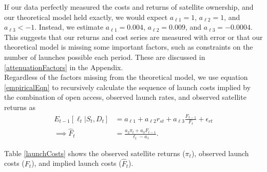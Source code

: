 \documentclass[12pt]{article}
\begin{document}
If our data perfectly measured the costs and returns of satellite ownership, and our theoretical model held exactly, we would expect $a_{\ell 1}=1$, $a_{\ell 2} = 1$, and $a_{\ell 3} < -1$. Instead, we estimate $a_{\ell 1}=0.004$, $a_{\ell 2} = 0.009$, and $a_{\ell 3} = -0.0004$. This suggests that our returns and cost series are measured with error or that our theoretical model is missing some important factors, such as constraints on the number of launches possible each period. These are discussed in \ref{attenuationFactors} in the Appendix.\\

Regardless of the factors missing from the theoretical model, we use equation \ref{empiricalEqn} to recursively calculate the sequence of launch costs implied by the combination of open access, observed launch rates, and observed satellite returns as
\begin{align}
E_{t-1}[\ell_t|S_t,D_t] &= a_{\ell 1} + a_{\ell 2} r_{st} + a_{\ell 3} \frac{F_{t-1}}{F_t} + \epsilon_{r t} \nonumber \\
\implies \hat{F}_t &=	\frac{a_2 \pi_t + a_3 F_{t-1}}{\ell_t - a_1}.
\end{align}

Table \ref{launchCosts} shows the observed satellite returns ($\pi_t$), observed launch costs ($F_t$), and implied launch costs ($\hat{F}_t$).
\end{document}
